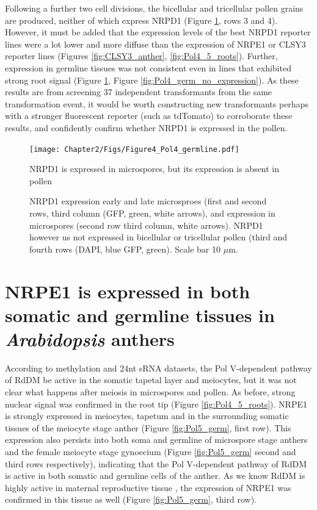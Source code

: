 Following a further two cell divisions, the bicellular and tricellular pollen grains are produced, neither of which express NRPD1 (Figure \ref{fig:Pol4_germ}, rows 3 and 4). However, it must be added that the expression levels of the best NRPD1 reporter lines were a lot lower and more diffuse than the expression of NRPE1 or CLSY3 reporter lines (Figures \ref{fig:CLSY3_anther}, \ref{fig:Pol4_5_roots}). Further, expression in germline tissues was not consistent even in lines that exhibited strong root signal (Figure \ref{fig:Pol4_germ}, Figure \ref{fig:Pol4_germ_no_expression}). As these results are from screening 37 independent transformants from the same transformation event, it would be worth constructing new transformants perhaps with a stronger fluorescent reporter (such as tdTomato) to corroborate these results, and confidently confirm whether NRPD1 is expressed in the pollen. 


\begin{figure}[htbp!] 
\centering    
    \texttt{[image: Chapter2/Figs/Figure4\_Pol4\_germline.pdf]}
\caption{NRPD1 is expressed in microspores, but its expression is absent in pollen}
\label{fig:Pol4_germ}
\captionsetup{font=small}
    \caption*{NRPD1 expression early and late microsproes (first and second rows, third column (GFP, green, white arrows), and expression in microspores (second row third column, white arrows). NRPD1 however us not expressed in bicellular or tricellular pollen (third and fourth rows (DAPI, blue GFP, green). Scale bar 10 $\mu$m.}
\end{figure}

\section{NRPE1 is expressed in both somatic and germline tissues in \textit{Arabidopsis} anthers}

According to methylation and 24nt sRNA datasets, the Pol V-dependent pathway of RdDM be active in the somatic tapetal layer and meiocytes, but it was not clear what happens after meiosis in microspores and pollen. As before, strong nuclear signal was confirmed in the root tip (Figure \ref{fig:Pol4_5_roots}). NRPE1 is strongly expressed in meiocytes, tapetum and in the surrounding somatic tissues of the meiocyte stage anther (Figure \ref{fig:Pol5_germ}, first row). This expression also persists into both soma and germline of microspore stage anthers and the female meiocyte stage gynoecium (Figure \ref{fig:Pol5_germ} second and third rows respectively), indicating that the Pol V-dependent pathway of RdDM is active in both somatic and germline cells of the anther. As we know RdDM is highly active in maternal reproductive tissue \cite{RN163,RN165}, the expression of NRPE1 was confirmed in this tissue as well (Figure \ref{fig:Pol5_germ}, third row).

